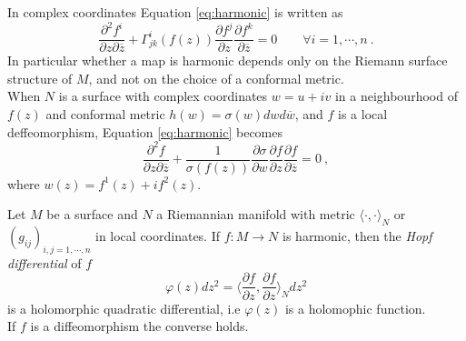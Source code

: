 \noindent In complex coordinates Equation \ref{eq:harmonic} is written as
\[
    \frac{\partial^2 f^i}{\partial z \partial \overline{z}} + \Gamma^i_{jk} (f(z)) \frac{\partial f^j}{\partial z} \frac{\partial f^k}{\partial \overline{z}} = 0 \qquad \forall i = 1, \cdots, n \ .
\]
In particular whether a map is harmonic depends only on the Riemann surface structure of $M$, and not on the choice of a conformal metric.\\
When $N$ is a surface with complex coordinates $w = u + iv$ in a neighbourhood of $f(z)$ and conformal metric $h(w) = \sigma(w) dw d\overline{w}$, and $f$ is a local deffeomorphism, Equation \ref{eq:harmonic} becomes
\begin{equation} \label{eq:harmonic2}
    \frac{\partial^2 f}{ \partial z   \partial \overline{z}} + \frac{1}{\sigma(f(z))} \frac{\partial \sigma}{ \partial w} \frac{\partial f}{\partial z} \frac{\partial f}{\partial \overline{z}} = 0 \ ,
\end{equation}
where $w(z) = f^1(z) + i f^2(z)$.
\begin{theorem} \label{thm:HQD}
    Let $M$ be a surface and $N$ a Riemannian manifold with metric $\langle \cdot,\cdot \rangle_N$ or $(g_{ij})_{i,j = 1, \cdots , n}$ in local coordinates. If $f:M \to N$ is harmonic, then the \textit{Hopf differential} of $f$
    \[
        \varphi(z) dz^2 = \Big\langle \frac{\partial f}{\partial z},  \frac{\partial f}{\partial z} \Big\rangle_N dz^2
    \]
    is a holomorphic quadratic differential, i.e $\varphi(z)$ is a holomophic function. \\
    If $f$ is a diffeomorphism the converse holds.
\end{theorem}
